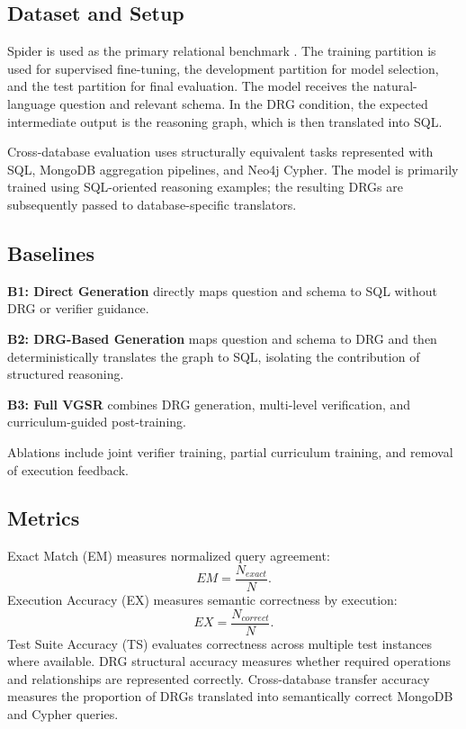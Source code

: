 \documentclass[conference]{IEEEtran}
\begin{document}
\subsection{Dataset and Setup}
Spider is used as the primary relational benchmark \cite{b2}. The training partition is used for supervised fine-tuning, the development partition for model selection, and the test partition for final evaluation. The model receives the natural-language question and relevant schema. In the DRG condition, the expected intermediate output is the reasoning graph, which is then translated into SQL.

Cross-database evaluation uses structurally equivalent tasks represented with SQL, MongoDB aggregation pipelines, and Neo4j Cypher. The model is primarily trained using SQL-oriented reasoning examples; the resulting DRGs are subsequently passed to database-specific translators.

\subsection{Baselines}
\textbf{B1: Direct Generation} directly maps question and schema to SQL without DRG or verifier guidance.

\textbf{B2: DRG-Based Generation} maps question and schema to DRG and then deterministically translates the graph to SQL, isolating the contribution of structured reasoning.

\textbf{B3: Full VGSR} combines DRG generation, multi-level verification, and curriculum-guided post-training.

Ablations include joint verifier training, partial curriculum training, and removal of execution feedback.

\subsection{Metrics}
Exact Match (EM) measures normalized query agreement:
\begin{equation}
EM=\frac{N_{exact}}{N}.
\end{equation}
Execution Accuracy (EX) measures semantic correctness by execution:
\begin{equation}
EX=\frac{N_{correct}}{N}.
\end{equation}
Test Suite Accuracy (TS) evaluates correctness across multiple test instances where available. DRG structural accuracy measures whether required operations and relationships are represented correctly. Cross-database transfer accuracy measures the proportion of DRGs translated into semantically correct MongoDB and Cypher queries.
\end{document}
